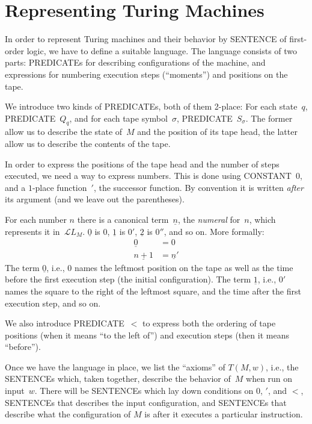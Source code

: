 \documentclass[10pt,a4paper]{article}
\newcommand*{\olup}[1]{\MakeUppercase{#1}}
\theoremstyle{plain}
\theoremstyle{definition}
\theoremstyle{remark}
\newenvironment{explain}{}{}
\newcommand*{\olfileid}[3]{}
\newcommand*{\olsection}[1]{\section*{#1}}
\providecommand{\Obj}{}
\providecommand{\Lang}{\ensuremath{\mathcal{L}}}
\providecommand{\num}[1]{\underline{#1}}
\begin{document}



\olfileid{tur}{und}{rep}
\olsection{Representing Turing Machines}

\begin{explain}
In order to represent Turing machines and their behavior by \olup{sentence}
of first-order logic, we have to define a suitable language. The
language consists of two parts: \olup{predicate}s for describing
configurations of the machine, and expressions for numbering execution
steps (``moments'') and positions on the tape.

We introduce two kinds of \olup{predicate}s, both of them 2-place: For
each state~$q$, \olup{predicate}~$\Obj Q_q$, and for each tape
symbol~$\sigma$, \olup{predicate}~$\Obj S_\sigma$. The former allow us
to describe the state of~$M$ and the position of its tape head, the
latter allow us to describe the contents of the tape.  

In order to express the positions of the tape head and the number of
steps executed, we need a way to express numbers. This is done using
\olup{constant}~$\Obj 0$, and a $1$-place function~$\prime$, the
successor function. By convention it is written \emph{after} its
argument (and we leave out the parentheses).

For each number $n$ there is a canonical term~$\num{n}$, the
\emph{numeral} for~$n$, which represents it in~$\Lang L_M$. $\num{0}$
is $\Obj 0$, $\num{1}$ is $\Obj 0'$, $\num{2}$ is $\Obj 0''$, and so
on. More formally:
\begin{align*}
\num{0} & = \Obj 0 \\
\num{n+1} &= \num{n}'
\end{align*}
The term $\num{0}$, i.e., $\Obj 0$ names the leftmost position on the
tape as well as the time before the first execution step (the initial
configuration). The term $\num{1}$, i.e., $\Obj 0'$ names the square
to the right of the leftmost square, and the time after the first
execution step, and so on.

We also introduce \olup{predicate}~$<$ to express both the ordering of
tape positions (when it means ``to the left of'') and execution steps
(then it means ``before'').

Once we have the language in place, we list the ``axioms'' of $T(M,
w)$, i.e., the \olup{sentence}s which, taken together, describe the
behavior of~$M$ when run on input~$w$.  There will be \olup{sentence}s
which lay down conditions on $\Obj 0$, $\prime$, and $<$,
\olup{sentence}s that describes the input configuration, and
\olup{sentence}s that describe what the configuration of $M$ is after it
executes a particular instruction.
\end{explain}
\end{document}
